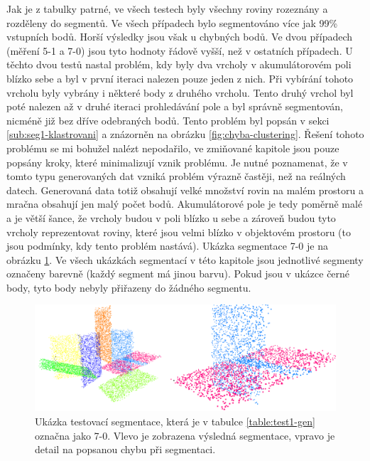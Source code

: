 \documentclass[11pt,twoside,a4paper]{book}
\begin{document}
Jak je z tabulky patrné, ve všech testech byly všechny roviny rozeznány a rozděleny do segmentů. Ve všech případech bylo segmentováno více jak 99\% vstupních bodů. Horší výsledky jsou však u chybných bodů. Ve dvou případech (měření 5-1 a 7-0) jsou tyto hodnoty řádově vyšší, než v ostatních případech. U těchto dvou testů nastal problém, kdy byly dva vrcholy v akumulátorovém poli blízko sebe a byl v první iteraci nalezen pouze jeden z nich. Při vybírání tohoto vrcholu byly vybrány i některé body z druhého vrcholu. Tento druhý vrchol byl poté nalezen až v druhé iteraci prohledávání pole a byl správně segmentován, nicméně již bez dříve odebraných bodů. Tento problém byl popsán v sekci \ref{sub:seg1-klastrovani} a znázorněn na obrázku \ref{fig:chyba-clustering}. Řešení tohoto problému se mi bohužel nalézt nepodařilo, ve zmiňované kapitole jsou pouze popsány kroky, které minimalizují vznik problému. Je nutné poznamenat, že v tomto typu generovaných dat vzniká problém výrazně častěji, než na reálných datech. Generovaná data totiž obsahují velké množství rovin na malém prostoru a mračna obsahují jen malý počet bodů. Akumulátorové pole je tedy poměrně malé a je větší šance, že vrcholy budou v poli blízko u sebe a zároveň budou tyto vrcholy reprezentovat roviny, které jsou velmi blízko v objektovém prostoru (to jsou podmínky, kdy tento problém nastává). Ukázka segmentace 7-0 je na obrázku \ref{fig:test-chyba-1}. Ve všech ukázkách segmentací v této kapitole jsou jednotlivé segmenty označeny barevně (každý segment má jinou barvu). Pokud jsou v ukázce černé body, tyto body nebyly přiřazeny do žádného segmentu.

\begin{figure}[H]
\begin{center}
\includegraphics[width=\textwidth]{figures/test-chyba-1}
\caption{Ukázka testovací segmentace, která je v tabulce \ref{table:test1-gen} označna jako 7-0. Vlevo je zobrazena výsledná segmentace, vpravo je detail na popsanou chybu při segmentaci.}
\label{fig:test-chyba-1}
\end{center}
\end{figure}
\end{document}
